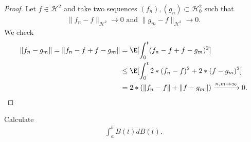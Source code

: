 \begin{proof}
  Let $f \in  \mathcal{H}^{2} $ and take two sequences $(f_n),(g_n) \subset  \mathcal{H}^{2}_0 $ such that 
  \begin{align*}
    \|f_n - f\|_{\mathcal{H}^2} \to  0 \text{ and } \|g_m - f\|_{\mathcal{H}^2} \to  0
  .\end{align*}
  We check 
  \begin{align*}
    \|f_n - g_m\| = \|f_n - f + f-g_m\| &=   \E[\int_0^{t} (f_n - f + f-g_m)^2  ]\\
                                        &\le \E[\int_0^{t} 2*(f_n-f)^2 + 2*(f-g_m)^2 ] \\
                                        &= 2*(\|f_n - f\| + \|f-g_m\|) \xrightarrow{n,m\to \infty} 0
  .\end{align*}
\end{proof}
\begin{exercise}
 Calculate 
 \begin{align*}
  \int_a^{b} B(t)dB(t) 
 .\end{align*}
\end{exercise}
